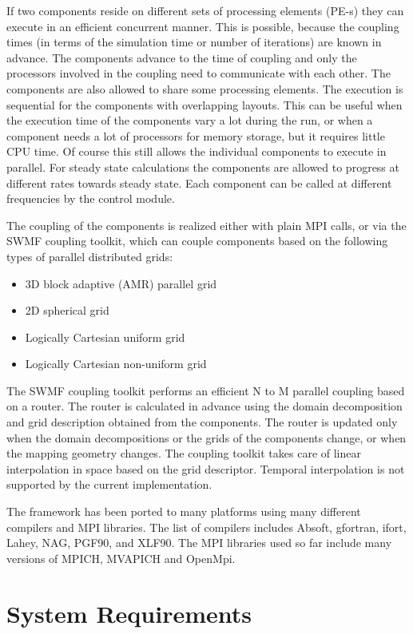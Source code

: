 If two components reside on different sets of processing elements
(PE-s) they can execute in an efficient concurrent manner.
This is possible, because the coupling times (in terms of the simulation time
or number of iterations) are known in advance.  
The components advance to the time of coupling and
only the processors involved in the coupling need to communicate with
each other. The components are also allowed to share some processing elements.
The execution is sequential for the components with overlapping layouts.
This can be useful when the execution time of the components vary a lot
during the run, or when a component needs a lot of processors 
for memory storage, but it requires little CPU time.
Of course this still allows the individual components to execute in parallel.
For steady state calculations the components are allowed to progress
at different rates towards steady state. Each component can be called
at different frequencies by the control module.

The coupling of the components is realized either with plain MPI
calls, or via the SWMF coupling toolkit, which can couple components
based on the following types of parallel distributed grids:
\begin{itemize}
\item 3D block adaptive (AMR) parallel grid
\item 2D spherical grid
\item Logically Cartesian uniform grid
\item Logically Cartesian non-uniform grid 
\end{itemize}
The SWMF coupling toolkit performs an efficient N to M parallel
coupling based on a router. The router is calculated in advance using
the domain decomposition and grid description obtained from the
components.  The router is updated only when the domain decompositions
or the grids of the components change, or when the mapping geometry
changes.  The coupling toolkit takes care of linear interpolation in
space based on the grid descriptor.  Temporal interpolation is not
supported by the current implementation.

The framework has been ported to many platforms using many different
compilers and MPI libraries. The list of compilers includes
Absoft, gfortran, ifort, Lahey, NAG, PGF90, and XLF90.
The MPI libraries used so far include many versions of MPICH, MVAPICH and 
OpenMpi. 

\section{System Requirements}

